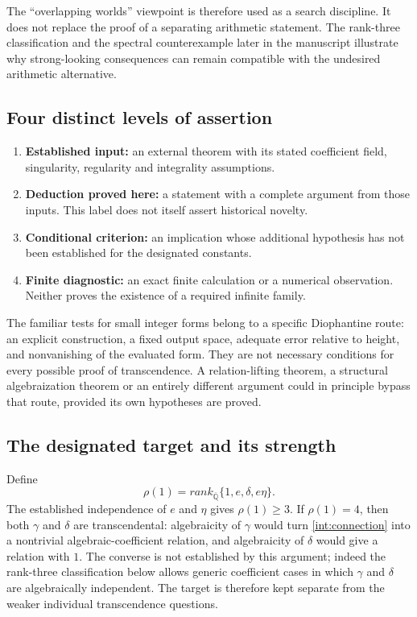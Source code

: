 \documentclass[11pt,a4paper]{article}
\theoremstyle{definition}
\theoremstyle{remark}
\theoremstyle{plain}
\numberwithin{equation}{section}
\def\operatorname#1{#1}\def\mathrm#1{#1}}
\begin{document}
The ``overlapping worlds'' viewpoint is therefore used as a search
discipline. It does not replace the proof of a separating arithmetic
statement. The rank-three classification and the spectral counterexample
later in the manuscript illustrate why strong-looking consequences can
remain compatible with the undesired arithmetic alternative.

\subsection{Four distinct levels of assertion}
\begin{enumerate}[leftmargin=*,itemsep=3pt]
\item \textbf{Established input:} an external theorem with its stated
coefficient field, singularity, regularity and integrality assumptions.
\item \textbf{Deduction proved here:} a statement with a complete argument
from those inputs. This label does not itself assert historical novelty.
\item \textbf{Conditional criterion:} an implication whose additional
hypothesis has not been established for the designated constants.
\item \textbf{Finite diagnostic:} an exact finite calculation or a numerical
observation. Neither proves the existence of a required infinite family.
\end{enumerate}

The familiar tests for small integer forms belong to a specific
Diophantine route: an explicit construction, a fixed output space,
adequate error relative to height, and nonvanishing of the evaluated
form. They are not necessary conditions for every possible proof of
transcendence. A relation-lifting theorem, a structural algebraization
theorem or an entirely different argument could in principle bypass that
route, provided its own hypotheses are proved.

\subsection{The designated target and its strength}
Define
\[
 \rho(1)=\operatorname{rank}_{\overline{\mathbb Q}}
 \{1,e,\delta,e\eta\}.
\]
The established independence of $e$ and $\eta$ gives $\rho(1)\ge3$.
If $\rho(1)=4$, then both $\gamma$ and $\delta$ are transcendental:
algebraicity of $\gamma$ would turn \eqref{int:connection} into a
nontrivial algebraic-coefficient relation, and algebraicity of $\delta$
would give a relation with $1$. The converse is not established by this
argument; indeed the rank-three classification below allows generic
coefficient cases in which $\gamma$ and $\delta$ are algebraically
independent. The target is therefore kept separate from the weaker
individual transcendence questions.
\end{document}
